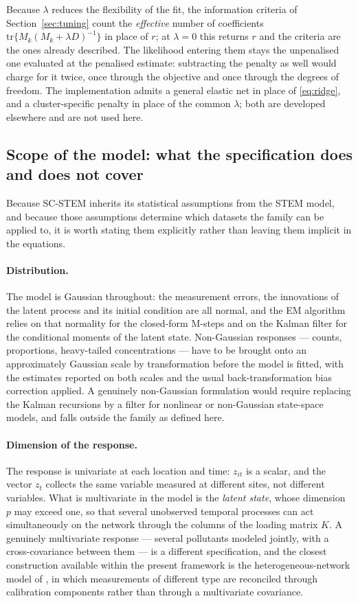 Because $\lambda$ reduces the flexibility of the fit, the information criteria of Section~\ref{sec:tuning} count the \emph{effective} number of coefficients $\mathrm{tr}\{M_k(M_k + \lambda D)^{-1}\}$ in place of $r$; at $\lambda = 0$ this returns $r$ and the criteria are the ones already described. The likelihood entering them stays the unpenalised one evaluated at the penalised estimate: subtracting the penalty as well would charge for it twice, once through the objective and once through the degrees of freedom. The implementation admits a general elastic net in place of \eqref{eq:ridge}, and a cluster-specific penalty in place of the common $\lambda$; both are developed elsewhere and are not used here.

\subsection{Scope of the model: what the specification does and does not cover}\label{sec2:scope}

Because SC-STEM inherits its statistical assumptions from the STEM model, and because those assumptions determine which datasets the family can be applied to, it is worth stating them explicitly rather than leaving them implicit in the equations.

\paragraph{Distribution.} The model is Gaussian throughout: the measurement errors, the innovations of the latent process and its initial condition are all normal, and the EM algorithm relies on that normality for the closed-form M-steps and on the Kalman filter for the conditional moments of the latent state. Non-Gaussian responses --- counts, proportions, heavy-tailed concentrations --- have to be brought onto an approximately Gaussian scale by transformation before the model is fitted, with the estimates reported on both scales and the usual back-transformation bias correction applied. A genuinely non-Gaussian formulation would require replacing the Kalman recursions by a filter for nonlinear or non-Gaussian state-space models, and falls outside the family as defined here.

\paragraph{Dimension of the response.} The response is univariate at each location and time: $z_{it}$ is a scalar, and the vector $z_t$ collects the same variable measured at different sites, not different variables. What is multivariate in the model is the \emph{latent state}, whose dimension $p$ may exceed one, so that several unobserved temporal processes can act simultaneously on the network through the columns of the loading matrix $K$. A genuinely multivariate response --- several pollutants modeled jointly, with a cross-covariance between them --- is a different specification, and the closest construction available within the present framework is the heterogeneous-network model of \citet{FassoCamelettiNicolis2007}, in which measurements of different type are reconciled through calibration components rather than through a multivariate covariance.

